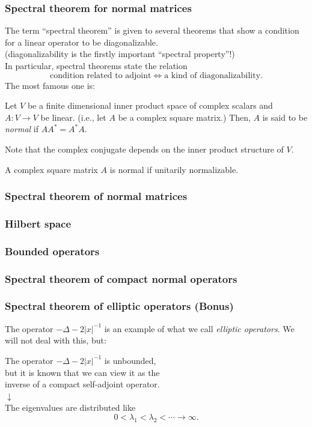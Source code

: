 \documentclass{beamer}
\begin{document}
\begin{frame}
\frametitle{Spectral theorem for normal matrices}
  The term ``spectral theorem'' is given to several theorems that show a condition for a linear operator to be diagonalizable.\\
  \pause (diagonalizability is the firstly important ``spectral property''!)\\
  \pause In particular, spectral theorems state the relation
  \[\text{condition related to adjoint} \iff \text{a kind of diagonalizability}.\]
  \pause The most famous one is:
  \begin{defn}
    Let $V$ be a finite dimensional inner product space of complex scalars and $A:V\to V$ be linear.
    (i.e., let $A$ be a complex square matrix.)
    Then, $A$ is said to be \emph{normal} if $AA^*=A^*A$.
  \end{defn}
  \pause Note that the complex conjugate depends on the inner product structure of $V$. \pause
  \begin{thm}
    A complex square matrix $A$ is normal if unitarily normalizable.
  \end{thm}
\end{frame}

\begin{frame}
\frametitle{Spectral theorem of normal matrices}
\end{frame}

\begin{frame}
\frametitle{Hilbert space}
\end{frame}

\begin{frame}
\frametitle{Bounded operators}
\end{frame}

\begin{frame}
\frametitle{Spectral theorem of compact normal operators}
\end{frame}

\begin{frame}
\frametitle{Spectral theorem of elliptic operators (Bonus)}
  The operator $-\Delta-2|x|^{-1}$ is an example of what we call \emph{elliptic operators}.
  \pause We will not deal with this, but:
  \bigskip
  \begin{center}
    \pause The operator $-\Delta-2|x|^{-1}$ is unbounded,\\
    \pause but it is known that we can view it as the\\
    inverse of a compact self-adjoint operator.\\
    \pause $\downarrow$ \\
    The eigenvalues are distributed like
    \[0<\lambda_1<\lambda_2<\cdots\to\infty.\]
  \end{center}
\end{frame}
\end{document}
